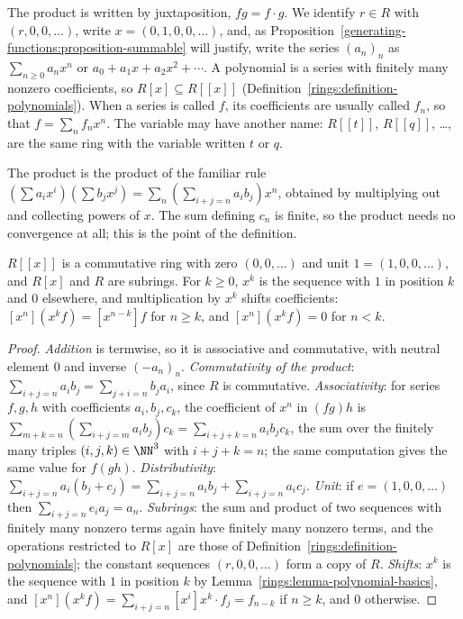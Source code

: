 \begin{notation}\label{generating-functions:notation-power-series}
The product is written by juxtaposition, $fg = f \cdot g$. We identify $r \in R$ with $(r, 0, 0, \ldots)$, write $x = (0, 1, 0, 0, \ldots)$, and, as Proposition~\ref{generating-functions:proposition-summable}
will justify, write the series $(a_n)_n$ as $\sum_{n \geq 0}a_nx^n$ or $a_0 + a_1x + a_2x^2 + \cdots$. A polynomial is a series with finitely many nonzero coefficients, so $R[x] \subseteq R[[x]]$
(Definition~\ref{rings:definition-polynomials}). When a series is called $f$, its coefficients are usually called $f_n$, so that $f = \sum_nf_nx^n$. The variable may have another name:
$R[[t]]$, $R[[q]]$, \ldots, are the same ring with the variable written $t$ or $q$.
\end{notation}

The product is the product of the familiar rule $(\sum a_ix^i)(\sum b_jx^j) = \sum_n(\sum_{i+j=n}a_ib_j)x^n$, obtained by multiplying out and collecting powers of $x$. The sum defining $c_n$ is finite,
so the product needs no convergence at all; this is the point of the definition.

\begin{lemma}\label{generating-functions:lemma-ring}
$R[[x]]$ is a commutative ring with zero $(0, 0, \ldots)$ and unit $1 = (1, 0, 0, \ldots)$, and $R[x]$ and $R$ are subrings. For $k \geq 0$, $x^k$ is the sequence with $1$ in position $k$ and $0$
elsewhere, and multiplication by $x^k$ shifts coefficients: $[x^n](x^kf) = [x^{n-k}]f$ for $n \geq k$, and $[x^n](x^kf) = 0$ for $n < k$.
\end{lemma}

\begin{proof}
\emph{Addition} is termwise, so it is associative and commutative, with neutral element $0$ and inverse $(-a_n)_n$.
\emph{Commutativity of the product}: $\sum_{i+j=n}a_ib_j = \sum_{j+i=n}b_ja_i$, since $R$ is commutative.
\emph{Associativity}: for series $f, g, h$ with coefficients $a_i, b_j, c_k$, the coefficient of $x^n$ in $(fg)h$ is $\sum_{m+k=n}(\sum_{i+j=m}a_ib_j)c_k = \sum_{i+j+k=n}a_ib_jc_k$, the sum over
the finitely many triples $(i, j, k) \in \NN^3$ with $i + j + k = n$; the same computation gives the same value for $f(gh)$.
\emph{Distributivity}: $\sum_{i+j=n}a_i(b_j + c_j) = \sum_{i+j=n}a_ib_j + \sum_{i+j=n}a_ic_j$.
\emph{Unit}: if $e = (1, 0, 0, \ldots)$ then $\sum_{i+j=n}e_ia_j = a_n$.
\emph{Subrings}: the sum and product of two sequences with finitely many nonzero terms again have finitely many nonzero terms, and the operations restricted to $R[x]$ are those of
Definition~\ref{rings:definition-polynomials}; the constant sequences $(r, 0, 0, \ldots)$ form a copy of $R$.
\emph{Shifts}: $x^k$ is the sequence with $1$ in position $k$ by Lemma~\ref{rings:lemma-polynomial-basics}, and $[x^n](x^kf) = \sum_{i+j=n}[x^i]x^k \cdot f_j = f_{n-k}$ if $n \geq k$, and $0$
otherwise.
\end{proof}

